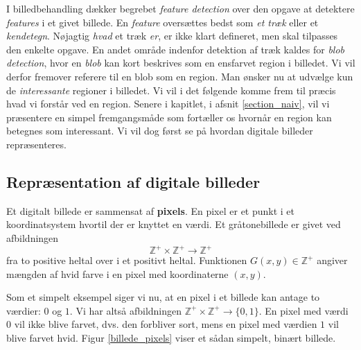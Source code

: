 {
{\sffamily I billedbehandling dækker begrebet \emph{feature detection}
over den opgave at detektere \emph{features} i et givet billede. En
\emph{feature} oversættes bedst som \emph{et træk} eller et
\emph{kendetegn}. Nøjagtig \emph{hvad} et træk \emph{er}, er ikke klart
defineret, men skal tilpasses den enkelte opgave. En andet område
indenfor detektion af træk kaldes for \emph{blob detection}, hvor en
\emph{blob} kan kort beskrives som en ensfarvet region i billedet. Vi
vil derfor fremover referere til en blob som en region. Man ønsker nu at
udvælge kun de \emph{interessante} regioner i billedet. Vi vil i det
følgende komme frem til præcis hvad vi forstår ved en region. Senere i
kapitlet, i afsnit \ref{section_naiv}, vil vi præsentere en simpel
fremgangsmåde som fortæller os hvornår en region kan betegnes som
interessant. Vi vil dog først se på hvordan digitale billeder
repræsenteres.
}

\subsection{Repræsentation af digitale billeder}
Et digitalt billede er sammensat af \textbf{pixels}. En pixel er et
punkt i et koordinatsystem hvortil der er knyttet en værdi. Et
gråtonebillede er givet ved afbildningen
\begin{equation}
    \mathbb{Z}^{+}\times{} \mathbb{Z}^{+} \rightarrow \mathbb{Z}^{+}
\end{equation}
fra to positive heltal over i et positivt heltal.
Funktionen $G(x, y) \in \mathbb{Z}^{+}$ angiver mængden af hvid farve i
en pixel med koordinaterne $(x, y)$.

Som et simpelt eksempel siger vi nu, at en pixel i et billede kan antage
to værdier: $0$ og $1$. Vi har altså afbildningen $\mathbb{Z}^{+}\times{}
\mathbb{Z}^{+} \rightarrow \{0, 1\}$. En pixel med værdi $0$ vil ikke
blive farvet, dvs. den forbliver sort, mens en pixel med værdien $1$ vil
blive farvet hvid.  Figur \ref{billede_pixels} viser et sådan simpelt,
binært billede.

}
